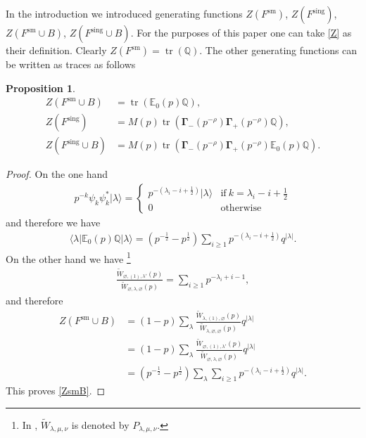 \documentclass{amsart}
\newtheorem{proposition}[theorem]{Proposition}
\theoremstyle{definition}
\newcommand{\QQ} {\mathbb{Q}}		%
\newcommand{\bfGamma} {\mathbf{\Gamma}}
\newcommand{\sm}{\mathrm{sm}}
\newcommand{\sing}{\mathrm{sing}}
\newcommand{\EE}{\mathbb{E}}
\newcommand{\tr}{\operatorname{tr}}
\begin{document}
In the introduction we introduced generating functions $Z(F^{\sm})$, $Z(F^{\sing})$, $Z(F^{\sm}\cup B)$, $Z(F^{\sing}\cup B)$. For the purposes of this paper one can take \eqref{Z} as their definition. Clearly $Z(F^{\sm}) = \tr(\QQ)$. The other generating functions can be written as traces as follows
\begin{proposition}
\begin{align} 
Z(F^{\sm} \cup B) &= \tr(\EE_0(p) \QQ), \label{ZsmB} \\
Z(F^{\sing}) &= M(p) \tr(\bfGamma_-(p^{-\rho}) \bfGamma_+(p^{-\rho}) \QQ), \label{Zsing} \\
Z(F^{\sing} \cup B) &= M(p) \tr(\bfGamma_-(p^{-\rho}) \bfGamma_+(p^{-\rho}) \EE_0(p) \QQ) \label{ZsingB}. 
\end{align}
\end{proposition}
\begin{proof}
On the one hand
\begin{align*} 
p^{-k} \psi_k \psi_{k}^{*} | \lambda \rangle = \left\{ \begin{array}{cc} p^{-(\lambda_i - i + \frac{1}{2})} | \lambda \rangle & \mathrm{if \ } k = \lambda_i-i+\frac{1}{2} \\ 0 & \mathrm{otherwise} \end{array} \right.
\end{align*}
and therefore we have
\begin{align*}
\langle \lambda | \EE_0(p) \QQ | \lambda \rangle = (p^{-\frac{1}{2}} - p^{\frac{1}{2}}) \sum_{i \geq 1} p^{-(\lambda_i-i+\frac{1}{2})} q^{|\lambda|}.
\end{align*}
On the other hand we have \cite[(3.20)]{ORV}\footnote{In \cite{ORV}, $\tilde{W}_{\lambda,\mu,\nu}$ is denoted by $P_{\lambda,\mu,\nu}$.}
\begin{align} \label{ORV}
\frac{\tilde{W}_{\varnothing,(1),\lambda'}(p)}{\tilde{W}_{\varnothing, \lambda, \varnothing}(p)} = \sum_{i \geq 1} p^{-\lambda_i+i-1},
\end{align}
and therefore
\begin{align*}
Z(F^{\sm} \cup B) &= (1-p) \sum_\lambda \frac{\tilde{W}_{\lambda, (1), \varnothing}(p)}{\tilde{W}_{\lambda, \varnothing, \varnothing}(p)} q^{|\lambda|} \\
&= (1-p) \sum_\lambda \frac{\tilde{W}_{\varnothing,(1),\lambda'}(p)}{\tilde{W}_{\varnothing, \lambda, \varnothing}(p)} q^{|\lambda|} \\
&= (p^{-\frac{1}{2}} - p^{\frac{1}{2}}) \sum_{\lambda} \sum_{i \geq 1} p^{-(\lambda_i-i+\frac{1}{2})} q^{|\lambda|}.
\end{align*} 
This proves \eqref{ZsmB}. 


\end{proof}
\end{document}
